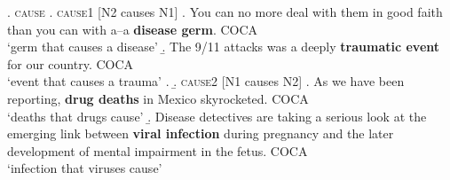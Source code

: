 \ex. \textsc{cause}
\a. \textsc{cause1} [N2 causes N1]
\a. \label{ex:disease_germ}
You can no more deal with them in good faith than you can with a--a \textbf{disease
germ}. COCA\\
`germ that causes a disease'
\b. \label{ex:traumatic_event}
The 9/11 attacks was a deeply \textbf{traumatic event} for our country. COCA\\
`event that causes a trauma'
\z.
\b. \textsc{cause2} [N1 causes N2]
\a. \label{ex:drug_deaths}%
As we have been reporting, \textbf{drug deaths} in Mexico skyrocketed. COCA
\\`deaths that drugs cause'
\b. \label{ex:viral_infection}%
Disease detectives are taking a serious look at the emerging link between
\textbf{viral infection} during pregnancy and the later development of mental
impairment in the fetus. COCA
\\ `infection that viruses cause'


